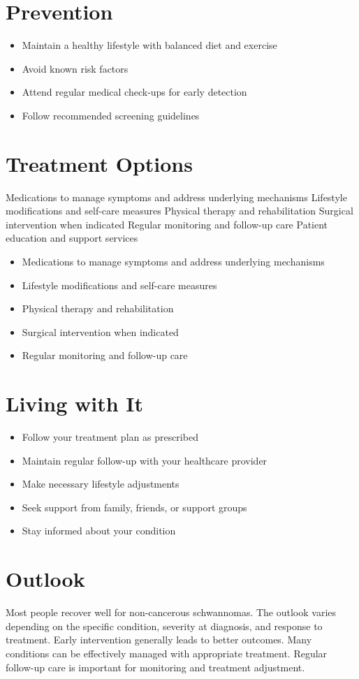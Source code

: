 \section{Prevention}
\begin{itemize}[noitemsep]
  \item Maintain a healthy lifestyle with balanced diet and exercise
  \item Avoid known risk factors
  \item Attend regular medical check-ups for early detection
  \item Follow recommended screening guidelines
\end{itemize}
\section{Treatment Options}
Medications to manage symptoms and address underlying mechanisms Lifestyle modifications and self-care measures Physical therapy and rehabilitation Surgical intervention when indicated Regular monitoring and follow-up care Patient education and support services

\begin{itemize}[noitemsep]
  \item Medications to manage symptoms and address underlying mechanisms
  \item Lifestyle modifications and self-care measures
  \item Physical therapy and rehabilitation
  \item Surgical intervention when indicated
  \item Regular monitoring and follow-up care
\end{itemize}
\section{Living with It}
\begin{itemize}[noitemsep]
  \item Follow your treatment plan as prescribed
  \item Maintain regular follow-up with your healthcare provider
  \item Make necessary lifestyle adjustments
  \item Seek support from family, friends, or support groups
  \item Stay informed about your condition
\end{itemize}
\section{Outlook}
Most people recover well for non-cancerous schwannomas. The outlook varies depending on the specific condition, severity at diagnosis, and response to treatment. Early intervention generally leads to better outcomes. Many conditions can be effectively managed with appropriate treatment. Regular follow-up care is important for monitoring and treatment adjustment.
